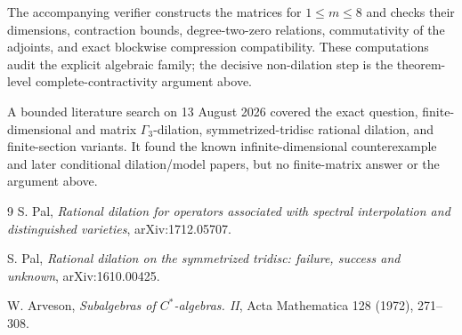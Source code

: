 \documentclass[11pt]{article}
\begin{document}
The accompanying verifier constructs the matrices for $1\leq m\leq8$ and
checks their dimensions, contraction bounds, degree-two-zero relations,
commutativity of the adjoints, and exact blockwise compression compatibility.
These computations audit the explicit algebraic family; the decisive
non-dilation step is the theorem-level complete-contractivity argument above.

A bounded literature search on 13 August 2026 covered the exact question,
finite-dimensional and matrix $\Gamma_3$-dilation, symmetrized-tridisc
rational dilation, and finite-section variants.  It found the known
infinite-dimensional counterexample and later conditional dilation/model
papers, but no finite-matrix answer or the argument above.

\small
\begin{thebibliography}{9}
S. Pal,
\emph{Rational dilation for operators associated with spectral interpolation
and distinguished varieties}, arXiv:1712.05707.

S. Pal,
\emph{Rational dilation on the symmetrized tridisc: failure, success and
unknown}, arXiv:1610.00425.

W. Arveson,
\emph{Subalgebras of $C^*$-algebras. II},
Acta Mathematica 128 (1972), 271--308.
\end{thebibliography}
\end{document}
